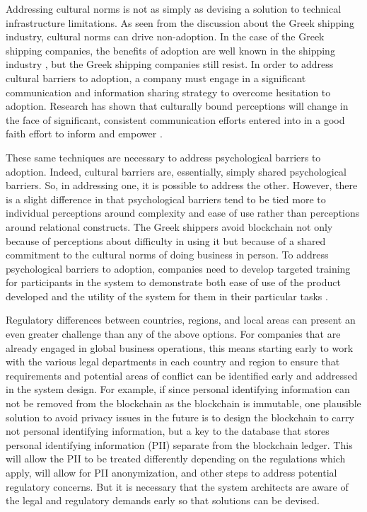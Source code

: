 Addressing cultural norms is not as simply as devising a solution to technical infrastructure limitations. As seen from the discussion about the Greek shipping industry, cultural norms can drive non-adoption. In the case of the Greek shipping companies, the benefits of adoption are well known in the shipping industry \parencite{groenfeldtIBMMaerskApply2017}, but the Greek shipping companies still resist. In order to address cultural barriers to adoption, a company must engage in a significant communication and information sharing strategy to overcome hesitation to adoption. Research has shown that culturally bound perceptions will change in the face of significant, consistent communication efforts entered into in a good faith effort to inform and empower \parencite{gefenTrustTAMOnline2003, parkUserAcceptanceDigital2009,dubeySwiftTrustCommitment2019}.

These same techniques are necessary to address psychological barriers to adoption. Indeed, cultural barriers are, essentially, simply shared psychological barriers. So, in addressing one, it is possible to address the other. However, there is a slight difference in that psychological barriers tend to be tied more to individual perceptions around complexity and ease of use rather than perceptions around relational constructs. The Greek shippers avoid blockchain not only because of perceptions about difficulty in using it but because of a shared commitment to the cultural norms of doing business in person. To address psychological barriers to adoption, companies need to develop targeted training for participants in the system to demonstrate both ease of use of the product developed and the utility of the system for them in their particular tasks \parencite{louIntegratingInnovationDiffusion2017}.

Regulatory differences between countries, regions, and local areas can present an even greater challenge than any of the above options. For companies that are already engaged in global business operations, this means starting early to work with the various legal departments in each country and region to ensure that requirements and potential areas of conflict can be identified early and addressed in the system design. For example, if since personal identifying information can not be removed from the blockchain as the blockchain is immutable, one plausible solution to avoid privacy issues in the future is to design the blockchain to carry not personal identifying information, but a key to the database that stores personal identifying information (PII) separate from the blockchain ledger. This will allow the PII to be treated differently depending on the regulations which apply, will allow for PII anonymization, and other steps to address potential regulatory concerns. But it is necessary that the system architects are aware of the legal and regulatory demands early so that solutions can be devised.
